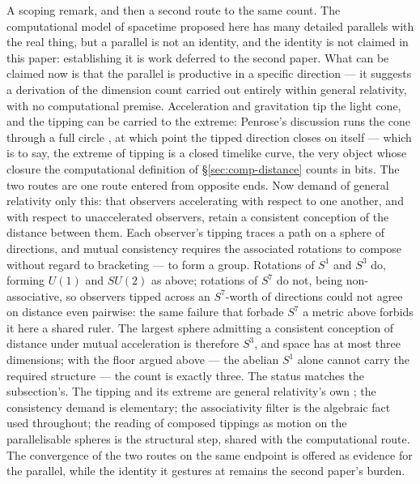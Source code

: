 A scoping remark, and then a second route to the same count. The computational model of spacetime
proposed here has many detailed parallels with the real thing, but a parallel is not an identity,
and the identity is not claimed in this paper: establishing it is work deferred to the second paper.
What can be claimed now is that the parallel is productive in a specific direction --- it suggests a
derivation of the dimension count carried out entirely within general relativity, with no
computational premise. Acceleration and gravitation tip the light cone, and the tipping can be
carried to the extreme: Penrose's discussion runs the cone through a full circle
\autocite[382]{Penrose1994}, at which point the tipped direction closes on itself --- which is to
say, the extreme of tipping is a closed timelike curve, the very object whose closure the
computational definition of \S\ref{sec:comp-distance} counts in bits. The two routes are one route
entered from opposite ends. Now demand of general relativity only this: that observers accelerating
with respect to one another, and with respect to unaccelerated observers, retain a consistent
conception of the distance between them. Each observer's tipping traces a path on a sphere of
directions, and mutual consistency requires the associated rotations to compose without regard to
bracketing --- to form a group. Rotations of $S^{1}$ and $S^{3}$ do, forming $U(1)$ and $SU(2)$ as
above; rotations of $S^{7}$ do not, being non-associative, so observers tipped across an
$S^{7}$-worth of directions could not agree on distance even pairwise: the same failure that forbade
$S^{7}$ a metric above forbids it here a shared ruler. The largest sphere admitting a consistent
conception of distance under mutual acceleration is therefore $S^{3}$, and space has at most three
dimensions; with the floor argued above --- the abelian $S^{1}$ alone cannot carry the required
structure --- the count is exactly three. The status matches the subsection's. The tipping and its
extreme are general relativity's own \autocite{Penrose1994}; the consistency demand is
elementary; the associativity filter is the algebraic fact used throughout; the reading of composed
tippings as motion on the parallelisable spheres is the structural step, shared with the
computational route. The convergence of the two routes on the same endpoint is offered as evidence
for the parallel, while the identity it gestures at remains the second paper's burden.
